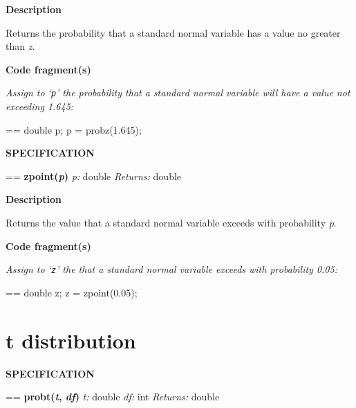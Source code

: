\documentclass{book}
\makeatletter
\newcommand\Texinfocommandstyletextvar[1]{{\normalfont{}\textsl{#1}}}%
\newenvironment{Texinfopreformatted}{%
  \par\GNUTobeylines\obeyspaces\frenchspacing\parskip=\z@\parindent=\z@}{}
{\catcode`\^^M=13 \gdef\GNUTobeylines{\catcode`\^^M=13 \def^^M{\null\par}}}
\newenvironment{Texinfoindented}{\begin{list}{}{}\item\relax}{\end{list}}
\renewcommand{\_}{\Texinfounderscore\discretionary{}{}{}}
\makeatother
\begin{document}
\noindent{}\textbf{Description}

Returns the probability that a standard normal variable
has a value no greater than \Texinfocommandstyletextvar{z}.

\noindent{}\textbf{Code fragment(s)}

\emph{Assign to `\texttt{p}' the probability that a standard normal variable
will have a value not exceeding 1.645:}
\begin{Texinfoindented}
\begin{Texinfopreformatted}%
\ttfamily double p;
p = probz(1.645);
\end{Texinfopreformatted}
\end{Texinfoindented}

\noindent{}\textbf{SPECIFICATION}
\begin{Texinfoindented}
\begin{Texinfopreformatted}%
\textbf{zpoint(\Texinfocommandstyletextvar{p})}
\Texinfocommandstyletextvar{p:} double
\Texinfocommandstyletextvar{Returns:} double
\end{Texinfopreformatted}
\end{Texinfoindented}

\noindent{}\textbf{Description}

Returns the value that a standard normal variable
exceeds with probability \Texinfocommandstyletextvar{p}.

\noindent{}\textbf{Code fragment(s)}

\emph{Assign to `\texttt{z}' the
that a standard normal variable
exceeds with probability 0.05:}
\begin{Texinfoindented}
\begin{Texinfopreformatted}%
\ttfamily double z;
z = zpoint(0.05);
\end{Texinfopreformatted}
\end{Texinfoindented}

\section{{t distribution}}
\label{anchor:t-distribution}%
%
%

\noindent{}\textbf{SPECIFICATION}
\begin{Texinfoindented}
\begin{Texinfopreformatted}%
\textbf{probt(\Texinfocommandstyletextvar{t}, \Texinfocommandstyletextvar{df})}
\Texinfocommandstyletextvar{t:} double
\Texinfocommandstyletextvar{df:} int
\Texinfocommandstyletextvar{Returns:} double
\end{Texinfopreformatted}
\end{Texinfoindented}
\end{document}
